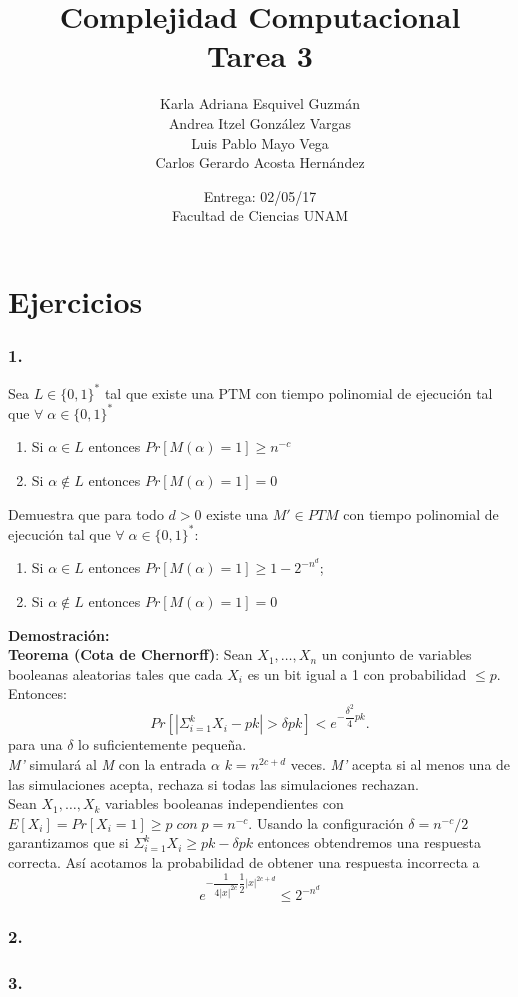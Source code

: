 \documentclass[12pt]{article}
\title{Complejidad Computacional \\ Tarea 3}
\author{Karla Adriana Esquivel Guzmán \\ Andrea Itzel González Vargas\\ Luis Pablo Mayo Vega \\ Carlos Gerardo Acosta Hernández}
\date{Entrega: 02/05/17 \\ Facultad de Ciencias UNAM}
\begin{document}
\maketitle
\section*{Ejercicios}
\subsubsection*{1.}
Sea $L \in \{0,1\}^*$ tal que existe una PTM con tiempo polinomial de ejecución tal que $\forall \; \alpha \in \{0,1\}^*$

\begin{enumerate}[label=\alph*)]
\item Si $\alpha \in L$ entonces $Pr[M(\alpha) = 1] \geq n^{-c}$
\item Si $\alpha \notin L$ entonces $Pr[M(\alpha) = 1] = 0$
\end{enumerate}
Demuestra que para todo $d > 0$ existe una $M' \in PTM$ con tiempo polinomial de ejecución tal que $\forall \;\alpha \in \{0,1\}^*$:
\begin{enumerate}[label=\alph*)]
\item Si $\alpha \in L$ entonces $Pr[M(\alpha) = 1] \geq 1 - 2^{-n^d}$;
\item Si $\alpha \notin L$ entonces $Pr[M(\alpha) = 1] = 0$
\end{enumerate}
\textsf{\textbf{Demostración:}}\\
\textbf{Teorema (Cota de Chernorff)}: Sean $X_1, \dots, X_n$ un conjunto de variables booleanas aleatorias tales que cada $X_i$ es un bit igual a 1 con probabilidad $\leq p$. Entonces:
\[Pr[|\Sigma_{i=1}^k X_i - pk | > \delta pk] < e^{-{\dfrac{\delta^2}4}pk}.\]
para una $\delta$ lo suficientemente pequeña. \\
\textit{M'} simulará al \textit{M} con la entrada $\alpha$ $k=n^{2c+d}$ veces. \textit{M'} acepta si al menos una de las simulaciones acepta, rechaza si todas las simulaciones rechazan.\\
Sean $X_1, \dots, X_k$ variables booleanas independientes con $E[X_i] = Pr[X_i=1] \geq p \; con \; p=n^{-c}$. Usando la configuración $\delta = n ^{-c}/2$ garantizamos que si $\Sigma_{i=1}^k X_i \geq pk - \delta pk$ entonces obtendremos una respuesta correcta. Así acotamos la probabilidad de obtener una respuesta incorrecta a
\[ e^{-{\dfrac{1}{4|x|^{2c}}}\dfrac{1}{2}|x|^{2c+d}} \leq 2^{-n^d} \]

\subsubsection*{2.}
\subsubsection*{3.}
\end{document}

